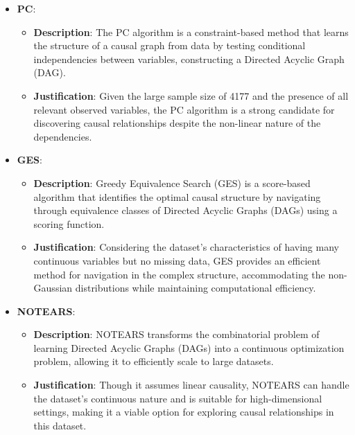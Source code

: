 \documentclass{article}
\begin{document}
\begin{itemize}

    \item \textbf{PC}:
    \begin{itemize}
        \item \textbf{Description}: The PC algorithm is a constraint-based method that learns the structure of a causal graph from data by testing conditional independencies between variables, constructing a Directed Acyclic Graph (DAG).
        \item \textbf{Justification}: Given the large sample size of 4177 and the presence of all relevant observed variables, the PC algorithm is a strong candidate for discovering causal relationships despite the non-linear nature of the dependencies.
    \end{itemize}

    \item \textbf{GES}:
    \begin{itemize}
        \item \textbf{Description}: Greedy Equivalence Search (GES) is a score-based algorithm that identifies the optimal causal structure by navigating through equivalence classes of Directed Acyclic Graphs (DAGs) using a scoring function.
        \item \textbf{Justification}: Considering the dataset’s characteristics of having many continuous variables but no missing data, GES provides an efficient method for navigation in the complex structure, accommodating the non-Gaussian distributions while maintaining computational efficiency.
    \end{itemize}

    \item \textbf{NOTEARS}:
    \begin{itemize}
        \item \textbf{Description}: NOTEARS transforms the combinatorial problem of learning Directed Acyclic Graphs (DAGs) into a continuous optimization problem, allowing it to efficiently scale to large datasets.
        \item \textbf{Justification}: Though it assumes linear causality, NOTEARS can handle the dataset's continuous nature and is suitable for high-dimensional settings, making it a viable option for exploring causal relationships in this dataset.
    \end{itemize}

\end{itemize}
\end{document}

